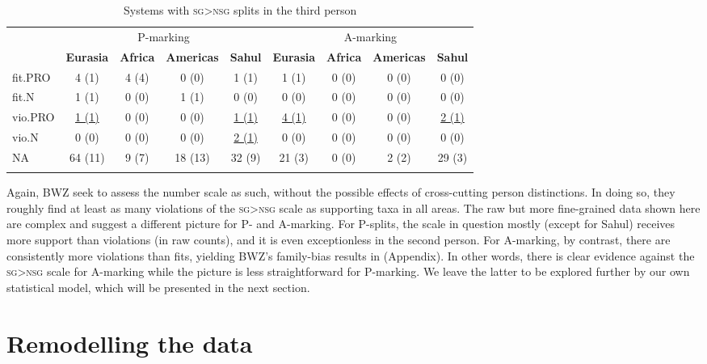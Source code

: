 \documentclass[output=paper]{langscibook}
\begin{document}
\begin{table}
\caption{Systems with \textsc{sg>nsg} splits in the third person}
\label{18-sc-tab:10c} 

{\small 
\begin{tabularx}{\textwidth}{l@{\hspace{1em}} cccccccc} 
\lsptoprule
& \multicolumn{4}{c}{P-marking} & \multicolumn{4}{c}{A-marking}\\


& \bfseries Eurasia & \bfseries Africa & \bfseries Americas & \bfseries Sahul   & \bfseries Eurasia & \bfseries Africa & \bfseries Americas & \bfseries Sahul\\
\midrule

fit.PRO & 4 (1) & 4 (4) & 0 (0) & 1 (1) &  1 (1) & 0 (0) & 0 (0) & 0 (0)\\
fit.N & 1 (1) & 0 (0) & 1 (1) & 0 (0) & 0 (0) & 0 (0) & 0 (0) & 0 (0)\\
vio.PRO & \underline{1 (1) }& 0 (0) & 0 (0) & \underline{1 (1)}  & \underline{4 (1)} & 0 (0) & 0 (0) & \underline{2 (1)}\\
vio.N & 0 (0) & 0 (0) & 0 (0) & \underline{2 (1)} & 0 (0) & 0 (0) & 0 (0) & 0 (0)\\
NA & 64 (11) & 9 (7) & 18 (13) & 32 (9) & 21 (3) & 0 (0) & 2  (2) & 29 (3)\\
\lspbottomrule
\end{tabularx}}
\end{table}

Again, BWZ seek to assess the number scale as such, without the possible effects of cross-cutting person distinctions. In doing so, they roughly find at least as many violations of the \textsc{sg>nsg} scale as supporting taxa in all areas. The raw but more fine-grained data shown here are complex and suggest a different picture for P- and A-marking. For P-splits, the scale in question mostly (\ie except for Sahul) receives more support than violations (in raw counts), and it is even exceptionless in the second person. For A-marking, by contrast, there are consistently more violations than fits, yielding BWZ’s family-bias results in  (Appendix). In other words, there is clear evidence against the \textsc{sg>nsg} scale for A-marking while the picture is less straightforward for P-marking. We leave the latter to be explored further by our own statistical model, which will be presented in the next section.

\section{Remodelling the data}
\label{18-sc-sec:3}
\end{document}
